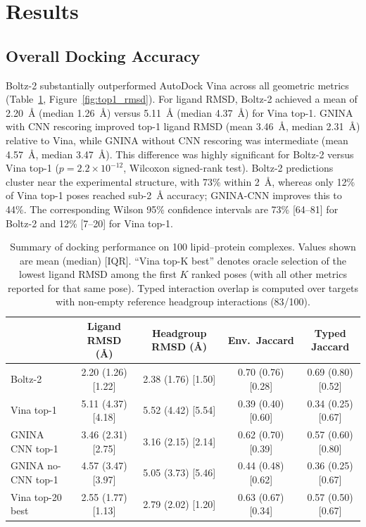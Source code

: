 \documentclass[journal=jcisd8,manuscript=article]{achemso}
\begin{document}
\section{Results}

\subsection{Overall Docking Accuracy}

Boltz-2 substantially outperformed AutoDock Vina across all geometric metrics (Table~\ref{tab:summary}, Figure~\ref{fig:top1_rmsd}).
For ligand RMSD, Boltz-2 achieved a mean of \SI{2.20}{\angstrom} (median \SI{1.26}{\angstrom}) versus \SI{5.11}{\angstrom} (median \SI{4.37}{\angstrom}) for Vina top-1.
GNINA with CNN rescoring improved top-1 ligand RMSD (mean \SI{3.46}{\angstrom}, median \SI{2.31}{\angstrom}) relative to Vina, while GNINA without CNN rescoring was intermediate (mean \SI{4.57}{\angstrom}, median \SI{3.47}{\angstrom}).
This difference was highly significant for Boltz-2 versus Vina top-1 ($p = 2.2 \times 10^{-12}$, Wilcoxon signed-rank test).
Boltz-2 predictions cluster near the experimental structure, with 73\% within \SI{2}{\angstrom}, whereas only 12\% of Vina top-1 poses reached sub-\SI{2}{\angstrom} accuracy; GNINA-CNN improves this to 44\%.
The corresponding Wilson 95\% confidence intervals are 73\% [64--81] for Boltz-2 and 12\% [7--20] for Vina top-1.

		\FloatBarrier
		\begin{table}[H]
		\centering
		\scriptsize
		\setlength{\tabcolsep}{2pt}
		\caption{Summary of docking performance on 100 lipid--protein complexes. Values shown are mean (median) [IQR]. ``Vina top-K best'' denotes oracle selection of the lowest ligand RMSD among the first $K$ ranked poses (with all other metrics reported for that same pose). Typed interaction overlap is computed over targets with non-empty reference headgroup interactions (83/100).}
		\label{tab:summary}
	\begin{tabular}{@{}lcccc@{}}
\toprule
 & Ligand RMSD (\AA) & Headgroup RMSD (\AA) & Env.\ Jaccard & Typed Jaccard \\
\midrule
Boltz-2 & 2.20 (1.26) [1.22] & 2.38 (1.76) [1.50] & 0.70 (0.76) [0.28] & 0.69 (0.80) [0.52] \\
Vina top-1 & 5.11 (4.37) [4.18] & 5.52 (4.42) [5.54] & 0.39 (0.40) [0.60] & 0.34 (0.25) [0.67] \\
GNINA CNN top-1 & 3.46 (2.31) [2.75] & 3.16 (2.15) [2.14] & 0.62 (0.70) [0.39] & 0.57 (0.60) [0.80] \\
GNINA no-CNN top-1 & 4.57 (3.47) [3.97] & 5.05 (3.73) [5.46] & 0.44 (0.48) [0.62] & 0.36 (0.25) [0.67] \\
Vina top-20 best & 2.55 (1.77) [1.13] & 2.79 (2.02) [1.20] & 0.63 (0.67) [0.34] & 0.57 (0.50) [0.67] \\
\bottomrule
	\end{tabular}
	\end{table}
\end{document}
